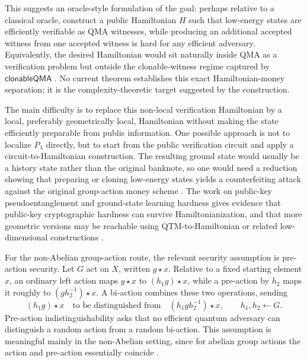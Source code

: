 \documentclass[12pt]{article}
\begin{document}
This suggests an oracle-style formulation of the goal: perhaps relative to a classical oracle, construct a public Hamiltonian $H$ such that low-energy states are efficiently verifiable as QMA witnesses, while producing an additional accepted witness from one accepted witness is hard for any efficient adversary.
Equivalently, the desired Hamiltonian would sit naturally inside QMA as a verification problem but outside the clonable-witness regime captured by $\mathsf{clonableQMA}$ \cite{nehoranComputationalSeparationQuantum2024,bostanciSeparatingQMAQCMA2025}.
No current theorem establishes this exact Hamiltonian-money separation; it is the complexity-theoretic target suggested by the construction.

The main difficulty is to replace this non-local verification Hamiltonian by a local, preferably geometrically local, Hamiltonian without making the state efficiently preparable from public information.
One possible approach is not to localize $P_\lambda$ directly, but to start from the public verification circuit and apply a circuit-to-Hamiltonian construction.
The resulting ground state would usually be a history state rather than the original banknote, so one would need a reduction showing that preparing or cloning low-energy states yields a counterfeiting attack against the original group-action money scheme \cite{aharonovAdiabaticQuantumComputation2008}.
The work on public-key pseudoentanglement and ground-state learning hardness gives evidence that public-key cryptographic hardness can survive Hamiltonianization, and that more geometric versions may be reachable using QTM-to-Hamiltonian or related low-dimensional constructions \cite{gottesmanQuantumClassicalComplexity2010,boulandPublickeyPseudoentanglementHardness2023,boulandHardnessLearningGround2024}.

For the non-Abelian group-action route, the relevant security assumption is pre-action security.
Let $G$ act on $X$, written $g\star x$.
Relative to a fixed starting element $x$, an ordinary left action maps $g\star x$ to $(h_1g)\star x$, while a pre-action by $h_2$ maps it roughly to $(gh_2^{-1})\star x$.
A bi-action combines these two operations, sending
\[
\left(h_1g\right)\star x
\quad\text{to be distinguished from}\quad
\left(h_1gh_2^{-1}\right)\star x,
\qquad h_1,h_2\leftarrow G.
\]
Pre-action indistinguishability asks that no efficient quantum adversary can distinguish a random action from a random bi-action.
This assumption is meaningful mainly in the non-Abelian setting, since for abelian group actions the action and pre-action essentially coincide \cite{bostanciGeneralQuantumDuality2025}.
\end{document}
